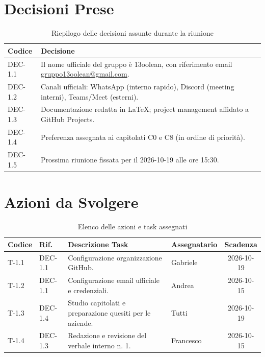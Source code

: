 \documentclass[11pt, a4paper]{article}
\makeatletter
\newcommand{\GroupName}{13oolean}
\newcommand{\GroupEmail}{\href{mailto:gruppo13oolean@gmail.com}{gruppo13oolean@gmail.com}}
\makeatother
\begin{document}
\section{Decisioni Prese}

\begin{table}[htbp]
\centering
\caption{Riepilogo delle decisioni assunte durante la riunione}
\label{tab:decisioni}
\begin{tabularx}{\textwidth}{l X}
\toprule
\textbf{Codice} & \textbf{Decisione} \\
\midrule
DEC-1.1 & Il nome ufficiale del gruppo è \GroupName, con riferimento email \GroupEmail. \\
DEC-1.2 & Canali ufficiali: WhatsApp (interno rapido), Discord (meeting interni), Teams/Meet (esterni). \\
DEC-1.3 & Documentazione redatta in \LaTeX; project management affidato a GitHub Projects. \\
DEC-1.4 & Preferenza assegnata ai capitolati C0 e C8 (in ordine di priorità). \\
DEC-1.5 & Prossima riunione fissata per il 2026-10-19 alle ore 15:30. \\
\bottomrule
\end{tabularx}
\end{table}

\section{Azioni da Svolgere}

\begin{table}[htbp]
\centering
\caption{Elenco delle azioni e task assegnati}
\label{tab:azioni}
\begin{tabularx}{\textwidth}{l l X l c}
\toprule
\textbf{Codice} & \textbf{Rif.} & \textbf{Descrizione Task} & \textbf{Assegnatario} & \textbf{Scadenza} \\
\midrule
T-1.1 & DEC-1.1 & Configurazione organizzazione GitHub. & Gabriele & 2026-10-19 \\
T-1.2 & DEC-1.1 & Configurazione email ufficiale e credenziali.                 & Andrea   & 2026-10-15 \\
T-1.3 & DEC-1.4 & Studio capitolati e preparazione quesiti per le aziende.      & Tutti    & 2026-10-19 \\
T-1.4 & DEC-1.3 & Redazione e revisione del verbale interno n. 1.              & Francesco & 2026-10-15 \\
\bottomrule
\end{tabularx}
\end{table}
\end{document}
